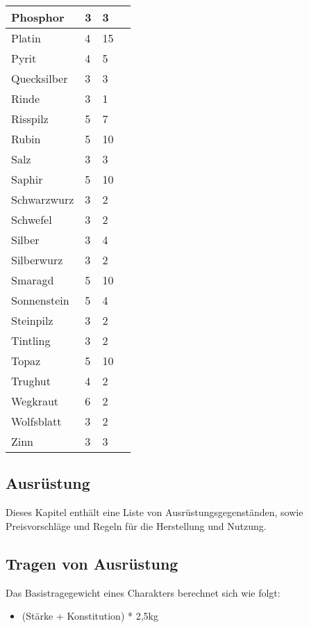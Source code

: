\documentclass{article}
\begin{document}
\begin{small}
\begin{tabular}{|m{3cm}|m{3cm}|m{4cm}|m{6cm}|}
Phosphor&3&3&\\
\hline
Platin&4&15&\\
\hline
Pyrit&4&5&\\
\hline
Quecksilber&3&3&\\
\hline
Rinde&3&1&\\
\hline
Risspilz&5&7&\\
\hline
Rubin&5&10&\\
\hline
Salz&3&3&\\
\hline
Saphir&5&10&\\
\hline
Schwarzwurz&3&2&\\
\hline
Schwefel&3&2&\\
\hline
Silber&3&4&\\
\hline
Silberwurz&3&2&\\
\hline
Smaragd&5&10&\\
\hline
Sonnenstein&5&4&\\
\hline
Steinpilz&3&2&\\
\hline
Tintling&3&2&\\
\hline
Topaz&5&10&\\
\hline
Trughut&4&2&\\
\hline
Wegkraut&6&2&\\
\hline
Wolfsblatt&3&2&\\
\hline
Zinn&3&3&\\
\hline
\end{tabular}
\end{small}

\newpage

\begin{center}
\section{Ausrüstung}
\end{center}

Dieses Kapitel enthält eine Liste von Ausrüstungsgegenständen, sowie Preisvorschläge und Regeln für die Herstellung
und Nutzung.

\begin{center}
\subsection{Tragen von Ausrüstung}
\end{center}

Das Basistragegewicht eines Charakters berechnet sich wie folgt:

\begin{itemize}
\item (Stärke + Konstitution) * 2,5kg
\end{itemize}
\end{document}
